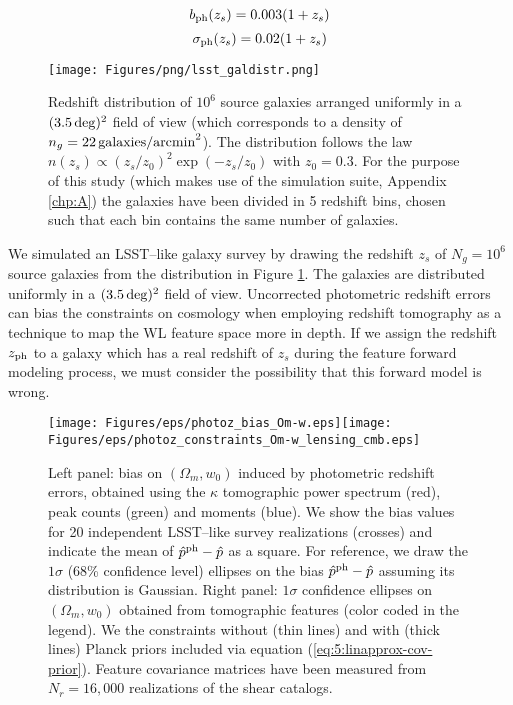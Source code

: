 \begin{equation}
\label{eq:7:bph}
b_{\rm ph}(z_s) = 0.003(1+z_s)
\end{equation}
%
\begin{equation}
\label{eq:7:sph}
\sigma_{\rm ph}(z_s) = 0.02(1+z_s)
\end{equation}
%
\begin{figure}
\begin{center}
\texttt{[image: Figures/png/lsst\_galdistr.png]}
\end{center}
\caption{Redshift distribution of $10^6$ source galaxies arranged uniformly in a $(3.5\,{\rm deg})^2$ field of view (which corresponds to a density of $n_g=22\,{\rm galaxies/arcmin}^2$). The distribution follows the law $n(z_s)\propto (z_s/z_0)^2\exp(-z_s/z_0)$ with $z_0=0.3$. For the purpose of this study (which makes use of the  simulation suite, Appendix \ref{chp:A}) the galaxies have been divided in 5 redshift bins, chosen such that each bin contains the same number of galaxies.}
\label{fig:7:galdistr}
\end{figure}
%
We simulated an LSST--like galaxy survey by drawing the redshift $z_s$ of $N_g=10^6$ source galaxies from the distribution in Figure \ref{fig:7:galdistr}. The galaxies are distributed uniformly in a $(3.5\,{\rm deg})^2$ field of view. Uncorrected photometric redshift errors can bias the constraints on cosmology when employing redshift tomography as a technique to map the WL feature space \citep{HutererWLSys,PetriPhotoZ} more in depth. If we assign the redshift $z_{\rm ph}$ to a galaxy which has a real redshift of $z_s$ during the feature forward modeling process, we must consider the possibility that this forward model is wrong. 
%
\begin{figure}
\begin{center}
\texttt{[image: Figures/eps/photoz\_bias\_Om-w.eps]}\texttt{[image: Figures/eps/photoz\_constraints\_Om-w\_lensing\_cmb.eps]}
\end{center}
\caption{Left panel: bias on $(\Omega_m,w_0)$ induced by photometric redshift errors, obtained using the $\kappa$ tomographic power spectrum (red), peak counts (green) and moments (blue). We show the bias values for 20 independent LSST--like survey realizations (crosses) and indicate the mean of $\hat{p}^{\rm ph}-\hat{p}$ as a square. For reference, we draw the $1\sigma$ (68\% confidence level) ellipses on the bias $\hat{p}^{\rm ph}-\hat{p}$ assuming its distribution is Gaussian. Right panel: $1\sigma$ confidence ellipses on $(\Omega_m,w_0)$ obtained from tomographic features (color coded in the legend). We the constraints without (thin lines) and with (thick lines) Planck \citep{Planck15} priors included via equation (\ref{eq:5:linapprox-cov-prior}). Feature covariance matrices have been measured from $N_r=16,000$ realizations of the shear catalogs.}
\label{fig:7:photoz}
\end{figure}
